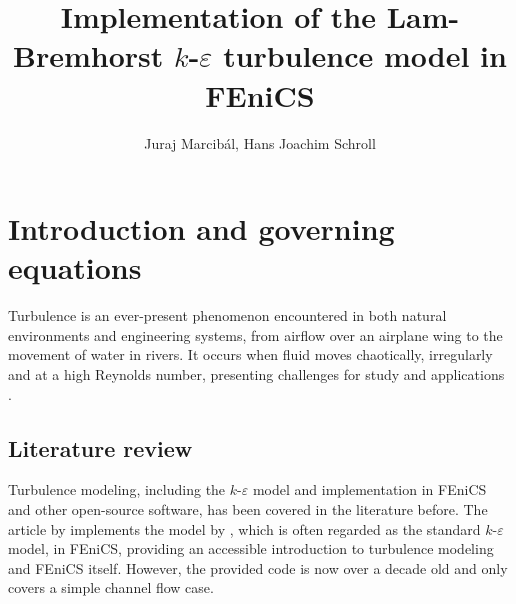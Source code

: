 \graphicspath{{chapters/marcibal/graphics/}} 

\title{Implementation of the Lam-Bremhorst \texorpdfstring{\(k\)-\(\varepsilon\)}{k-e} turbulence model in FEniCS}

\author{Juraj Marcibál, Hans Joachim Schroll}


\maketitle



\section{Introduction and governing equations}

Turbulence is an ever-present phenomenon encountered in both natural environments and engineering systems, from airflow over an airplane wing to the movement of water in rivers. It occurs when fluid moves chaotically, irregularly and at a high Reynolds number, presenting challenges for study and applications \citep{wilcox_turbulence_2006}. 

\subsection{Literature review}

Turbulence modeling, including the \(k\)-\(\varepsilon\) model and implementation in FEniCS and other open-source software, has been covered in the literature before. The article by \cite{valen_implementing_2013} implements the model by \citep{launder_application_1974}, which is often regarded as the standard \(k\)-\(\varepsilon\) model, in FEniCS, providing an accessible introduction to turbulence modeling and FEniCS itself. However, the provided code is now over a decade old and only covers a simple channel flow case. 

